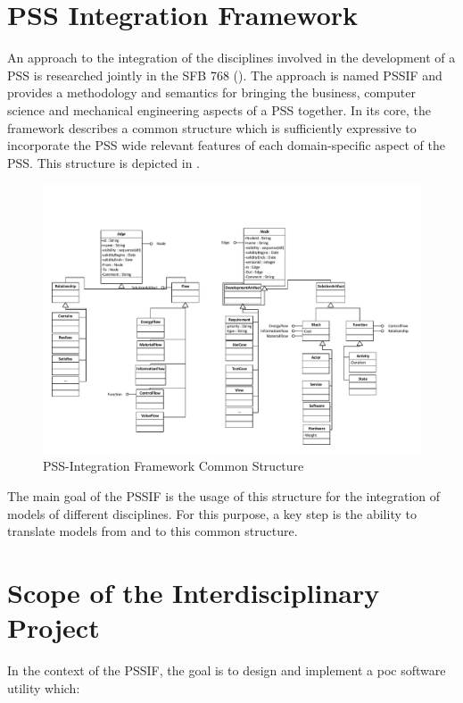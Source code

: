 \section*{PSS Integration Framework}

An approach to the integration of the disciplines involved in the development of a \gls{PSS} is researched jointly in the SFB 768 (\cite{ref:sfb}). The approach is named \gls{PSSIF} \cite{ref:paper} and provides a methodology and semantics for bringing the business, computer science and mechanical engineering aspects of a \gls{PSS} together. In its core, the framework describes a common structure which is sufficiently expressive to incorporate the \gls{PSS} wide relevant features of each domain-specific aspect of the PSS. This structure is depicted in .

\begin{figure}
\centering
\includegraphics[width=\textwidth]{figures/PSSIF.pdf}
\caption{PSS-Integration Framework Common Structure}
\label{fig:canonic}
\end{figure}

The main goal of the \gls{PSSIF} is the usage of this structure for the integration of models of different disciplines. For this purpose, a key step is the ability to translate models from and to this common structure.

\section*{Scope of the Interdisciplinary Project}

In the context of the \gls{PSSIF}, the goal is to design and implement a \gls{poc} software utility which:


